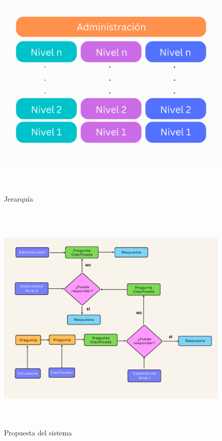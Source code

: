 \begin{figure}[h]
	\includegraphics[width=15cm, height=11.25cm]{hierarchy.png}
	\caption{Jerarquía}
	\label{fig:hierarchy}
\end{figure}


\begin{figure}[h]
	\includegraphics[width=15cm, height=11.25cm]{thesis_diagram.png}
	\caption{Propuesta del sistema}
	\label{fig:myprop}
\end{figure}


